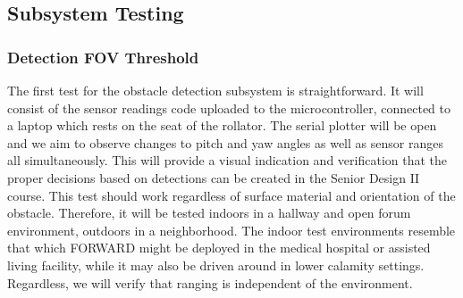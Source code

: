 \subsection{Subsystem Testing}

\subsubsection{Detection FOV Threshold}
\noindent The first test for the obstacle detection subsystem is straightforward. It will consist of the sensor readings code uploaded to the microcontroller, connected to a laptop which rests on the seat of the rollator. The serial plotter will be open and we aim to observe changes to pitch and yaw angles as well as sensor ranges all simultaneously. This will provide a visual indication and verification that the proper decisions based on detections can be created in the Senior Design II course. This test should work regardless of surface material and orientation of the obstacle. Therefore, it will be tested indoors in a hallway and open forum environment, outdoors in a neighborhood. The indoor test environments resemble that which FORWARD might be deployed in the medical hospital or assisted living facility, while it may also be driven around in lower calamity settings. Regardless, we will verify that ranging is independent of the environment.\\

